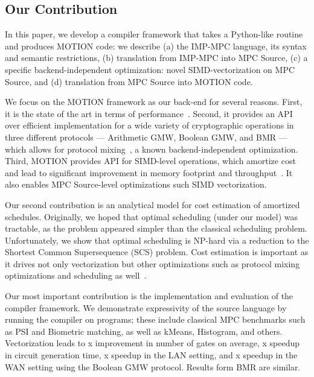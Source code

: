 \subsection{Our Contribution} In this paper, we develop a compiler framework that takes a Python-like routine and produces MOTION code: we describe (a) the IMP-MPC language, its syntax and semantic restrictions, (b) translation from IMP-MPC into MPC Source, (c) a specific backend-independent optimization: novel SIMD-vectorization on MPC Source, and (d) translation from MPC Source into MOTION code. %

We focus on the MOTION framework as our back-end for several reasons. First, it is the state of the art in terms of performance~\cite{Braun:2022}. Second, it provides an API over efficient implementation for a wide variety of cryptographic operations in three different protocols ---  Arithmetic GMW, Boolean GMW, and BMR --- which allows for protocol mixing~\cite{Ishaq:2019, Fang:2022}, a known backend-independent optimization. Third, MOTION provides API for SIMD-level operations, which amortize cost and lead to significant improvement in memory footprint and
throughput~\cite{NDSS:DemSchZoh15, CCS:ABFKLO18, Braun:2022}. It also enables MPC Source-level optimizations such SIMD vectorization.

Our second contribution is an analytical model for cost estimation of amortized schedules. Originally, we hoped that optimal scheduling (under our model) was tractable, as the problem
appeared simpler than the classical scheduling problem. Unfortunately, we show that optimal scheduling is NP-hard via a reduction to the Shortest Common Supersequence (SCS) problem.
Cost estimation is important as it drives not only vectorization but other optimizations such as protocol mixing optimizations and scheduling as well~\cite{Ishaq:2019, Fang:2022}.

Our most important contribution is the implementation and evaluation of the compiler framework. We demonstrate expressivity of the source language by running the compiler on  programs; these include classical MPC benchmarks such as PSI and Biometric matching, as well as kMeans, Histogram, and others. Vectorization leads to x improvement in number of gates on average, x speedup in circuit generation time, x speedup in the LAN setting, and x speedup in the WAN setting using the Boolean GMW protocol. Results form BMR are similar.

